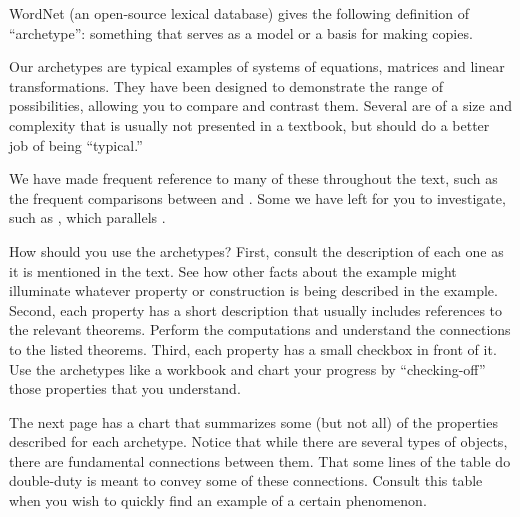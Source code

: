 %
\begin{introduction}
\begin{para}WordNet (an open-source lexical database) gives the following definition of ``archetype'':  something that serves as a model or a basis for making copies.\end{para}
%
\begin{para}Our archetypes are typical examples of systems of equations, matrices and linear transformations.  They have been designed to demonstrate the range of possibilities, allowing you to compare and contrast them.  Several are of a size and complexity that is usually not presented in a textbook, but should do a better job of being ``typical.''\end{para}
%
\begin{para}We have made frequent reference to many of these throughout the text, such as the frequent comparisons between  and .  Some we have left for you to investigate, such as , which parallels .\end{para}
%
\begin{para}How should you use the archetypes?  First, consult the description of each one as it is mentioned in the text.  See how other facts about the example might illuminate whatever property or construction is being described in the example.  Second, each property has a short description that usually includes references to the relevant theorems.  Perform the computations and understand the connections to the listed theorems.  Third, each property has a small checkbox in front of it.  Use the archetypes like a workbook and chart your progress by ``checking-off'' those properties that you understand.\end{para}
%
\begin{para}The next page has a chart that summarizes some (but not all) of the properties described for each archetype.  Notice that while there are several types of objects, there are fundamental connections between them.  That some lines of the table do double-duty is meant to convey some of these connections.  Consult this table when you wish to quickly find an example of a certain phenomenon.\end{para}
\end{introduction}
%
%
%
% 

